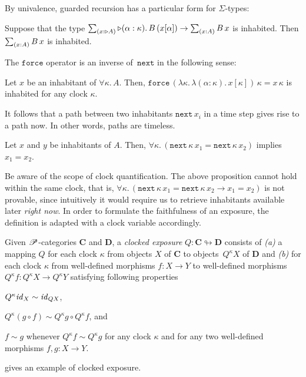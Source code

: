 \documentclass[a4paper,UKenglish,numberwithinsect,cleveref,thm-restate,draft]{lipics-v2021}
\numberwithin{equation}{section}
\theoremstyle{definition}
\theoremstyle{plain}
\begin{document}
By univalence, guarded recursion has a particular form for $\Sigma$-types:
\begin{corollary} \label{coro:lob-induction-sum}
  Suppose that the type $\sm{x : \laterp A} \laterp (\alpha : \kappa).\,B\,(x[\alpha]) \to \sm{x : A} B\,x$ is inhabited.
  Then $\sm{x : A} B\,x$ is inhabited.
\end{corollary}

The $\mathtt{force}$ operator is an inverse of~$\mathtt{next}$ in the following sense:
\begin{lemma}
  Let $x$ be an inhabitant of $\forall \kappa.\, A$. Then, 
  $\mathtt{force}\,(\lambda \kappa.\,\lambda (\alpha : \kappa).\, x [\kappa])\,\kappa = x\,\kappa$ is inhabited for any clock $\kappa$.
\end{lemma}

It follows that a path between two inhabitants $\mathtt{next}\,x_i$ in a time step gives rise to a path now.
In other words, paths are timeless.
\begin{proposition}\label{lem:later-identity}
  Let $x$ and $y$ be inhabitants of $A$. Then, $\forall \kappa.\, \left(\mathtt{next}\,\kappa\,x_1 = \mathtt{next}\,\kappa\,x_2\right)$ implies $x_1 = x_2$.
\end{proposition}
Be aware of the scope of clock quantification.
The above proposition cannot hold within the same clock, that is, $\forall \kappa.\, \left(\mathtt{next}\,\kappa\,x_1 = \mathtt{next}\,\kappa\,x_2 \to x_1 =x_2\right)$ is not provable, since intuitively it would require us to retrieve inhabitants available later \emph{right now}.
In order to formulate the faithfulness of an exposure, the definition is adapted with a clock variable accordingly.
\begin{definition}
  Given $\mathscr{P}$-categories $\mathbf{C}$ and $\mathbf{D}$, a \emph{clocked exposure} $Q\colon \mathbf{C} \looparrowright \mathbf{D}$ consists of \emph{(a)} a mapping $Q$ for each clock $\kappa$ from objects $X$ of $\mathbf{C}$ to objects~$Q^\kappa X$ of $\mathbf{D}$ and \emph{(b)} for each clock $\kappa$ from well-defined morphisms $f\colon X \to Y$ to well-defined morphisms $Q^\kappa f\colon Q^\kappa X \to Q^\kappa Y$ satisfying following properties
  \begin{romanenumerate}
    \item $Q^\kappa \mathit{id}_X \sim \mathit{id}_{QX}$,
    \item $Q^\kappa (g \circ f) \sim Q^\kappa g \circ Q^\kappa f$, and
    \item $f \sim g$ whenever $Q^\kappa f \sim Q^\kappa g$ for any clock $\kappa$ and for any two well-defined morphisms $f, g\colon X \to Y$. 
  \end{romanenumerate}
\end{definition}
 gives an example of clocked exposure.
\end{document}
